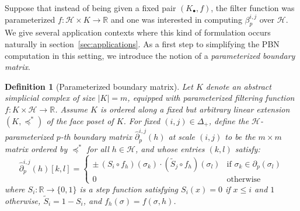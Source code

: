 \documentclass[10pt]{article}
\numberwithin{equation}{section}
\newcommand{\+}{%
	\raisebox{0.18ex}{\scaleobj{0.55}{+}}
}
\newtheorem{definition}{Definition}
\theoremstyle{definition}
\begin{document}
Suppose that instead of being given a fixed pair $(K_\bullet, f)$, the filter function was parameterized $f : \mathcal{H} \times K \to \mathbb{R}$ and one was interested in computing $\beta_p^{i,j}$ over $\mathcal{H}$. We give several application contexts where this kind of formulation occurs naturally in section~\ref{sec:applications}. As a first step to simplifying the PBN computation in this setting, we introduce the notion of a \emph{parameterized boundary matrix}.
\begin{definition}[Parameterized boundary matrix]\label{def:time_boundary_matrix}
Let $K$ denote an abstract simplicial complex of size $\lvert K \rvert = m$, equipped with parameterized filtering function $f : K \times \mathcal{H} \to \mathbb{R}$. 
Assume $K$ is ordered along a fixed but arbitrary linear extension $(K, \preceq^\ast)$ of the face poset of $K$. For fixed $(i,j) \in \Delta_{+}$, define the $\mathcal{H}$-\emph{parameterized} $p$\emph{-th boundary matrix} $\hat{\partial}_p^{i, j}(h)$ \emph{at scale} $(i,j)$ to be the $m \times m$ matrix ordered by $\preceq^\ast$ for all $h \in \mathcal{H}$, and whose entries $(k,l)$ satisfy:
\begin{equation}\label{eq:param_boundary_matrix}
	\hat{\partial}_p^{i,j}(h)[k,l] = \begin{cases}
	\pm \, (S_{i} \circ f_h)(\sigma_k) \cdot (\tilde{S}_{j} \circ f_h)(\sigma_l) & \text{if } \sigma_k \in \partial_p(\sigma_l) \\
	0 & \text{otherwise}
\end{cases}
\end{equation}
where $S_{i} : \mathbb{R} \to \{0, 1\}$ is a \emph{step} function satisfying $S_i(x) = 0$ if $x \leq i$ and $1$ otherwise, $\tilde{S}_{i} = 1 - S_i$, and $f_h(\sigma) = f(\sigma, h)$.
\end{definition}
\end{document}
